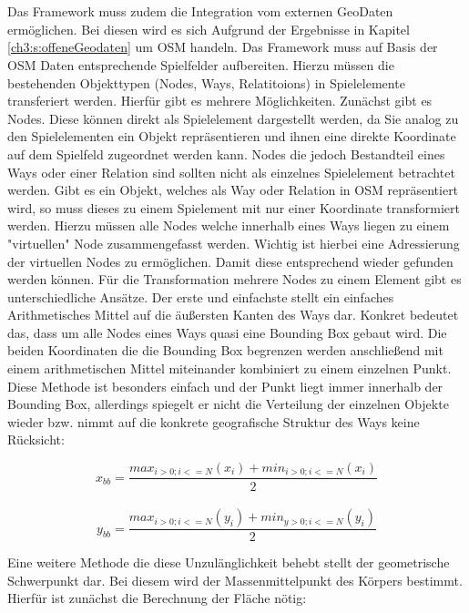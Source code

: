 \\\\
Das Framework muss zudem die Integration vom externen GeoDaten ermöglichen. Bei diesen wird es sich Aufgrund der Ergebnisse in Kapitel \ref{ch3:s:offeneGeodaten} um OSM handeln. Das Framework muss auf Basis der OSM Daten entsprechende Spielfelder aufbereiten. Hierzu müssen die bestehenden Objekttypen (Nodes, Ways, Relatitoions) in Spielelemente transferiert werden. Hierfür gibt es mehrere Möglichkeiten.
Zunächst gibt es Nodes. Diese können direkt als Spielelement dargestellt werden, da Sie analog zu den Spielelementen ein Objekt repräsentieren und ihnen eine direkte Koordinate auf dem Spielfeld zugeordnet werden kann. Nodes die jedoch Bestandteil eines Ways oder einer Relation sind sollten nicht als einzelnes Spielelement betrachtet werden.
Gibt es ein Objekt, welches als Way oder Relation in OSM repräsentiert wird, so muss dieses zu einem Spielement mit nur einer Koordinate transformiert werden. Hierzu müssen alle Nodes welche innerhalb eines Ways liegen zu einem "virtuellen" Node zusammengefasst werden.
Wichtig ist hierbei eine Adressierung der virtuellen Nodes zu ermöglichen. Damit diese entsprechend wieder gefunden werden können.
Für die Transformation mehrere Nodes zu einem Element gibt es unterschiedliche Ansätze. Der erste und einfachste stellt ein einfaches Arithmetisches Mittel auf die äußersten Kanten des Ways dar. Konkret bedeutet das, dass um alle Nodes eines Ways quasi eine Bounding Box gebaut wird. Die beiden Koordinaten die die Bounding Box begrenzen werden anschließend mit einem arithmetischen Mittel miteinander kombiniert zu einem einzelnen Punkt. Diese Methode ist besonders einfach und der Punkt liegt immer innerhalb der Bounding Box, allerdings spiegelt er nicht die Verteilung der einzelnen Objekte wieder bzw. nimmt auf die konkrete geografische Struktur des Ways keine Rücksicht:

\begin{equation}
x_{bb} = \frac{max_{i>0; i<=N}(x_i) + min_{i>0; i<=N}(x_i)}{2}
\end{equation}
\\
\begin{equation}
y_{bb} = \frac{max_{i>0; i<=N}(y_i) + min_{y>0; i<=N}(y_i)}{2}
\end{equation}

Eine weitere Methode die diese Unzulänglichkeit behebt stellt der geometrische Schwerpunkt dar.
Bei diesem wird der Massenmittelpunkt des Körpers bestimmt\cite{Papula.2006}. Hierfür ist zunächst die Berechnung der Fläche nötig:

